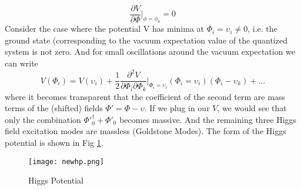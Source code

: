 \documentclass[secnumarabic, graphics,floatfix,nofootinbib,amsmath
tightenlines,nobibnotes,aps,prl,12pt]{revtex4-1}
\newcommand{\beeq}{\begin{equation}}
\newcommand{\eeeq}{\end{equation}}
\begin{document}
\begin{equation}
\frac{\partial V}{\partial \Phi}\bigg\rvert_{\phi=\phi_0}=0
\end{equation}
Consider the  case where the potential V has minima at $\Phi_i=\upsilon_i\neq0$, i.e. the ground state (corresponding to the vacuum expectation value of the quantized system is not zero. And for small oscillations around the vacuum expectation we can write
\beeq
V(\Phi_i)=V(\upsilon_i)+\frac{1}{2}\frac{\partial^2 V}{\partial \Phi_i \partial \Phi_k}\bigg\rvert_{\Phi_i=\upsilon_i} (\Phi_i=\upsilon_i)(\Phi_i-\upsilon_k)+...
\eeeq
 where it becomes transparent that the coefficient of the second term are mass terms of the (shifted) fields $\Phi'=\Phi-\upsilon$. If we plug in our $V$, we would see that only the combination $\Phi'_0^{\dagger}+\Phi'_0$ becomes massive. And the remaining three Higgs field excitation modes are massless (Goldstone Modes).
The form of the Higgs potential is shown in Fig \ref{11}.
\begin{figure}[ht!]
\centering
\texttt{[image: newhp.png]}
\caption{Higgs Potential\label{11}}
\end{figure}
\end{document}
